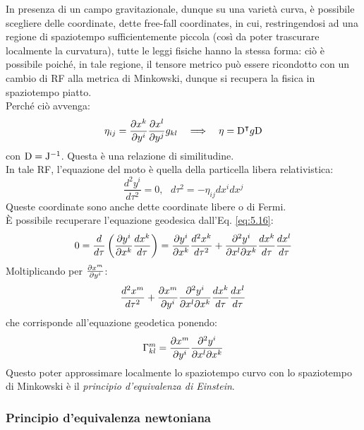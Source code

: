 In presenza di un campo gravitazionale, dunque su una varietà curva, è possibile scegliere delle coordinate, dette free-fall coordinates, in cui, restringendosi ad una regione di spaziotempo sufficientemente piccola (così da poter trascurare localmente la curvatura), tutte le leggi fisiche hanno la stessa forma: ciò è possibile poiché, in tale regione, il tensore metrico può essere ricondotto con un cambio di RF alla metrica di Minkowski, dunque si recupera la fisica in spaziotempo piatto.\\
Perché ciò avvenga:
\begin{equation}
	\eta_{ij} = \frac{\partial x^k}{\partial y^i} \frac{\partial x^l}{\partial y^j} g_{kl} \quad\Longrightarrow\quad \eta = \mathrm{D}^{\intercal} g \mathrm{D}
	\label{eq:5.15}
\end{equation}
con $ \mathrm{D} = \mathrm{J}^{-1} $. Questa è una relazione di similitudine.\\
In tale RF, l'equazione del moto è quella della particella libera relativistica:
\begin{equation}
	\frac{d^2 y^i}{d \tau^2} = 0, \,\,\,\, d\tau^2 = - \eta_{ij} dx^i dx^j
	\label{eq:5.16}
\end{equation}
Queste coordinate sono anche dette coordinate libere o di Fermi.\\
È possibile recuperare l'equazione geodesica dall'Eq. \ref{eq:5.16}:
\begin{equation}
	0 = \frac{d}{d\tau} \left( \frac{\partial y^i}{\partial x^k} \frac{dx^k}{d\tau} \right) = \frac{\partial y^i}{\partial x^k} \frac{d^2 x^k}{d\tau^2} + \frac{\partial^2 y^i}{\partial x^l \partial x^k} \frac{dx^k}{d\tau} \frac{dx^l}{d\tau}
	\label{eq:5.17}
\end{equation}
Moltiplicando per $ \frac{\partial x^m}{\partial y^i} $:
\begin{equation}
	\frac{d^2 x^m}{d\tau^2} + \frac{\partial x^m}{\partial y^i} \frac{\partial^2 y^i}{\partial x^l \partial x^k} \frac{dx^k}{d\tau} \frac{dx^l}{d\tau}
	\label{eq:5.18}
\end{equation}
che corrisponde all'equazione geodetica ponendo:
\begin{equation}
	\Gamma^m_{kl} = \frac{\partial x^m}{\partial y^i} \frac{\partial^2 y^i}{\partial x^l \partial x^k}
	\label{eq:5.19}
\end{equation}
Questo poter approssimare localmente lo spaziotempo curvo con lo spaziotempo di Minkowski è il \textit{principio d'equivalenza di Einstein}.

\subsubsection{Principio d'equivalenza newtoniana}

